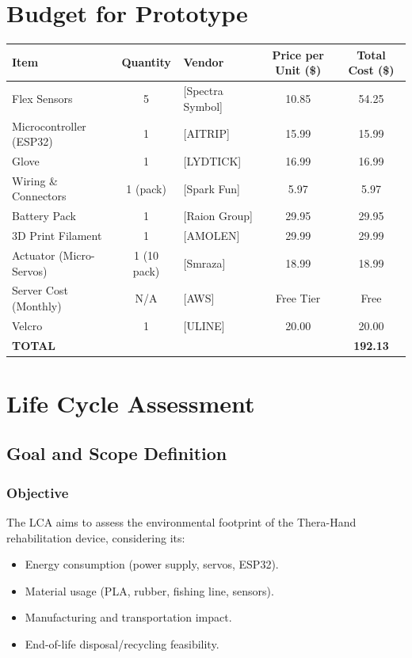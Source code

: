 \documentclass{article}
\begin{document}
\section{Budget for Prototype}

\begin{table}[h]
    \hspace*{-2.2cm}
    \centering
    \begin{tabular}{|l|c|l|c|c|}
        \hline
        \textbf{Item} & \textbf{Quantity} & \textbf{Vendor} & \textbf{Price per Unit (\$)} & \textbf{Total Cost (\$)} \\ 
        \hline
        Flex Sensors & 5 & [Spectra Symbol] & 10.85 & 54.25 \\ 
        \hline
        Microcontroller (ESP32) & 1 & [AITRIP] & 15.99 & 15.99 \\ 
        \hline
        Glove & 1 & [LYDTICK] & 16.99 & 16.99 \\ 
        \hline
        Wiring \& Connectors & 1 (pack) & [Spark Fun] & 5.97 & 5.97 \\ 
        \hline
        Battery Pack & 1 & [Raion Group] & 29.95 & 29.95 \\ 
        \hline
        3D Print Filament & 1 & [AMOLEN] & 29.99 & 29.99 \\ 
        \hline
        Actuator (Micro-Servos) & 1 (10 pack) & [Smraza] & 18.99 & 18.99 \\ 
        \hline
        Server Cost (Monthly) & N/A & [AWS] & Free Tier & Free \\ 
        \hline
        Velcro & 1 & [ULINE] & 20.00 & 20.00 \\ 
        \hline
        \textbf{TOTAL} & & & & \textbf{192.13} \\ 
        \hline
    \end{tabular}
    \label{tab:cost}
\end{table}
\section{Life Cycle Assessment}
\subsection{Goal and Scope Definition}
\subsubsection{Objective}
The LCA aims to assess the environmental footprint of the Thera-Hand rehabilitation device, considering its:
\begin{itemize}
\item Energy consumption (power supply, servos, ESP32).
\item Material usage (PLA, rubber, fishing line, sensors).
\item Manufacturing and transportation impact.
\item End-of-life disposal/recycling feasibility.
\end{itemize}
\end{document}
